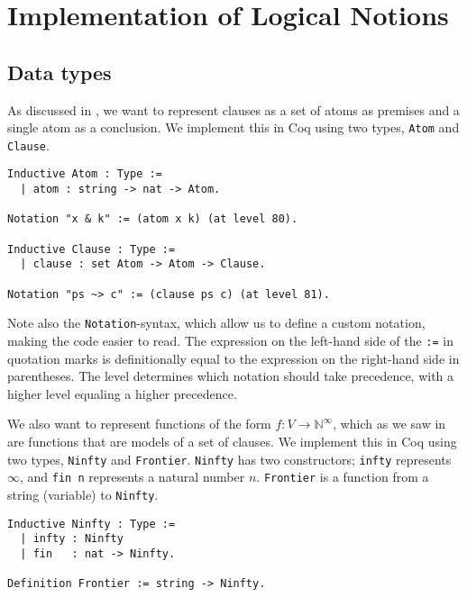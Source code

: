 \chapter{Implementation of Logical Notions}
\label{chap:implementation}

\section{Data types}

As discussed in , we want to represent clauses as
a set of atoms as premises and a single atom as a conclusion.
We implement this in Coq using two types, \lstinline{Atom} and \lstinline{Clause}.

\begin{minipage}{\linewidth}
\begin{lstlisting}[language=Coq, label={lst:atom_clause_def}, caption={\lstinline{Atom} and \lstinline{Clause} in Coq}]
Inductive Atom : Type :=
  | atom : string -> nat -> Atom.

Notation "x & k" := (atom x k) (at level 80).

Inductive Clause : Type :=
  | clause : set Atom -> Atom -> Clause.

Notation "ps ~> c" := (clause ps c) (at level 81).
\end{lstlisting}
\end{minipage}

Note also the \lstinline{Notation}-syntax, which allow us to define a custom notation,
making the code easier to read. The expression on the left-hand side of the \lstinline{:=} in quotation marks
is definitionally equal to the expression on the right-hand side in parentheses.
The level determines which notation should take precedence, with a higher level equaling a higher precedence.

We also want to represent functions of the form $f : V \rightarrow \mathbb{N}^{\infty}$,
which as we saw in 
are functions that are models of a set of clauses.
We implement this in Coq using two types, \lstinline{Ninfty} and \lstinline{Frontier}.
\lstinline{Ninfty} has two constructors; \lstinline{infty} represents $\infty$,
and \lstinline{fin n} represents a natural number $n$.
\lstinline{Frontier} is a function from a string (variable) to \lstinline{Ninfty}.

\begin{minipage}{\linewidth}
\begin{lstlisting}[language=Coq, label={lst:ninfty_frontier_def}, caption={\lstinline{Ninfty} and \lstinline{Frontier} in Coq}]
Inductive Ninfty : Type :=
  | infty : Ninfty
  | fin   : nat -> Ninfty.

Definition Frontier := string -> Ninfty.
\end{lstlisting}
\end{minipage}

